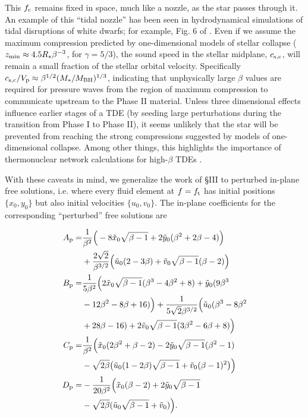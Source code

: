 \documentclass[useAMS, twocolumn, usenatbib]{mn2e}
\begin{document}
This $f_{\rm c}$ remains fixed in space, much like a nozzle, as the star passes through it.  An example of this ``tidal nozzle'' has been seen in hydrodynamical simulations of tidal disruptions of white dwarfs; for example, Fig. 6 of \citet{RosswogRR09}.  Even if we assume the maximum compression predicted by one-dimensional models of stellar collapse ($z_{\rm min}\approx 4.5R_*\beta^{-3}$, for $\gamma=5/3$), the sound speed in the stellar midplane, $c_{\rm s, c}$, will remain a small fraction of the stellar orbital velocity.  Specifically $c_{\rm s, c}/V_{\rm p}\approx \beta^{1/2}(M_*/M_{\rm BH})^{1/3}$, indicating that unphysically large $\beta$ values are required for pressure waves from the region of maximum compression to communicate upstream to the Phase II material.  Unless three dimensional effects influence earlier stages of a TDE (by seeding large perturbations during the transition from Phase I to Phase II), it seems unlikely that the star will be prevented from reaching the strong compressions suggested by models of one-dimensional collapse.  Among other things, this highlights the importance of thermonuclear network calculations for high-$\beta$ TDEs \citep{LuminetPichon89}.

With these caveats in mind, we generalize the work of \S III to perturbed in-plane free solutions, i.e. where every fluid element at $f=f_{\rm t}$ has initial positions $\{x_0, y_0\}$ but also initial velocities $\{u_0, v_0\}$.  The in-plane coefficients for the corresponding ``perturbed'' free solutions are

\begin{align}\label{xyuvICs}
A_{\rm p}=&\frac{1}{\beta^2} \Big(-8 \tilde{x}_0 \sqrt{\beta -1} + 2\tilde{y}_0 (\beta^2+2\beta -4)\Big) \\
&+ \frac{2\sqrt{2}}{\beta^{3/2}}\Big (\tilde{u}_0(2-3\beta)+\tilde{v}_0\sqrt{\beta-1}(\beta-2)\Big) \notag \\
B_{\rm p}=&\frac{1}{5\beta^2} \Big(2 \tilde{x}_0 \sqrt{\beta -1} (\beta^3-4\beta^2+8) + \tilde{y}_0 (9\beta^3\\
&-12\beta^2-8\beta+16)\Big) +\frac{1}{5\sqrt{2}\beta^{3/2}}\Big(\tilde{u}_0(\beta^3-8\beta^2\notag \\
&+28\beta-16)+2\tilde{v}_0\sqrt{\beta-1}(3\beta^2-6\beta+8) \Big) \notag \\
C_{\rm p}=&\frac{1}{\beta^2} \Big(\tilde{x}_0 (2\beta^2+\beta-2) - 2 \tilde{y}_0 \sqrt{\beta-1} (\beta^2 -1) \\
&-\sqrt{2\beta} \big(\tilde{u}_0(1-2\beta)\sqrt{\beta-1}+\tilde{v}_0(\beta-1)^2\big )\Big)\notag \\
D_{\rm p}=&-\frac{1}{20\beta^2} \Big(\tilde{x}_0 (\beta - 2) + 2 \tilde{y}_0 \sqrt{\beta -1}\\
&-\sqrt{2\beta}(\tilde{u}_0\sqrt{\beta-1}+\tilde{v}_0)\Big). \notag
\end{align}
\end{document}
